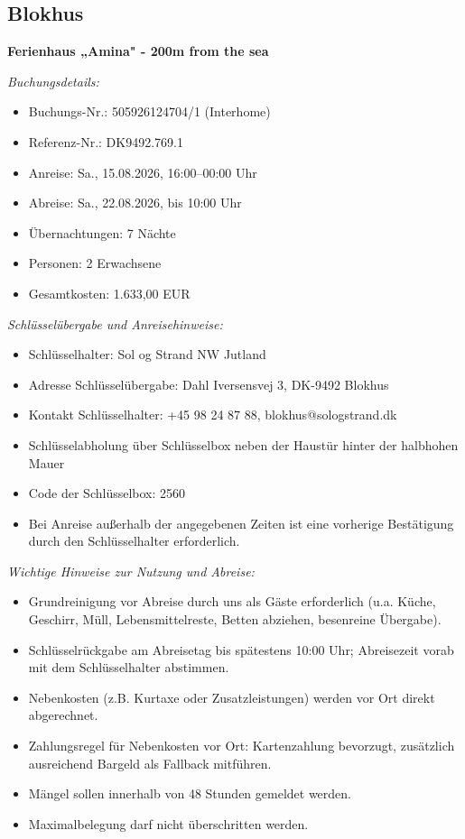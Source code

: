 \documentclass[a4paper,12pt]{article}
\begin{document}
\subsection{Blokhus}

\textbf{Ferienhaus „Amina" - 200m from the sea}

\textit{Buchungsdetails:}
\begin{itemize}
\item Buchungs-Nr.: 505926124704/1 (Interhome)
\item Referenz-Nr.: DK9492.769.1
\item Anreise: Sa., 15.08.2026, 16:00--00:00 Uhr
\item Abreise: Sa., 22.08.2026, bis 10:00 Uhr
\item Übernachtungen: 7 Nächte
\item Personen: 2 Erwachsene
\item Gesamtkosten: \mbox{1.633},00 EUR
\end{itemize}

\textit{Schlüsselübergabe und Anreisehinweise:}
\begin{itemize}
\item Schlüsselhalter: Sol og Strand NW Jutland
\item Adresse Schlüsselübergabe: Dahl Iversensvej 3, DK-9492 Blokhus
\item Kontakt Schlüsselhalter: +45 98 24 87 88, blokhus@sologstrand.dk
\item Schlüsselabholung über Schlüsselbox neben der Haustür hinter der halbhohen Mauer
\item Code der Schlüsselbox: 2560
\item Bei Anreise außerhalb der angegebenen Zeiten ist eine vorherige Bestätigung durch den Schlüsselhalter erforderlich.
\end{itemize}

\textit{Wichtige Hinweise zur Nutzung und Abreise:}
\begin{itemize}
\item Grundreinigung vor Abreise durch uns als Gäste erforderlich (u.a. Küche, Geschirr, Müll, Lebensmittelreste, Betten abziehen, besenreine Übergabe).
\item Schlüsselrückgabe am Abreisetag bis spätestens 10:00 Uhr; Abreisezeit vorab mit dem Schlüsselhalter abstimmen.
\item Nebenkosten (z.B. Kurtaxe oder Zusatzleistungen) werden vor Ort direkt abgerechnet.
\item Zahlungsregel für Nebenkosten vor Ort: Kartenzahlung bevorzugt, zusätzlich ausreichend Bargeld als Fallback mitführen.
\item Mängel sollen innerhalb von 48 Stunden gemeldet werden.
\item Maximalbelegung darf nicht überschritten werden.
\end{itemize}
\end{document}
